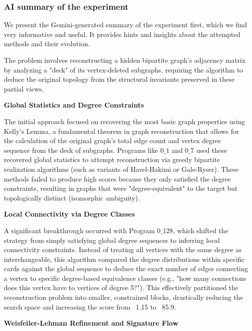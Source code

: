 \documentclass[11pt]{amsart}
\begin{document}
\subsubsection{AI summary of the experiment} We present the Gemini-generated summary of the experiment first, which we find very informative and useful. It provides hints and insights about the attempted methods and their evolution.
\begin{tcolorbox}[
  enhanced,
  breakable,
  title={Gemini-generated summary},
  colback=gray!3,
  colframe=black!30,
  title after break={Gemini-generated summary (continued)}
]
The problem involves reconstructing a hidden bipartite graph's adjacency matrix by analyzing a "deck" of its vertex-deleted subgraphs, requiring the algorithm to deduce the original topology from the structural invariants preserved in these partial views.

\noindent \textbf{Global Statistics and Degree Constraints}

The initial approach focused on recovering the most basic graph properties using Kelly’s Lemma, a fundamental theorem in graph reconstruction that allows for the calculation of the original graph's total edge count and vertex degree sequence from the deck of subgraphs. Programs like $0\_1$ and $0\_7$ used these recovered global statistics to attempt reconstruction via greedy bipartite realization algorithms (such as variants of Havel-Hakimi or Gale-Ryser). These methods failed to produce high scores because they only satisfied the degree constraints, resulting in graphs that were "degree-equivalent" to the target but topologically distinct (isomorphic ambiguity).

\noindent \textbf{Local Connectivity via Degree Classes}

A significant breakthrough occurred with Program $0\_128$, which shifted the strategy from simply satisfying global degree sequences to inferring local connectivity constraints. Instead of treating all vertices with the same degree as interchangeable, this algorithm compared the degree distributions within specific cards against the global sequence to deduce the exact number of edges connecting a vertex to specific degree-based equivalence classes (e.g., "how many connections does this vertex have to vertices of degree 5?"). This effectively partitioned the reconstruction problem into smaller, constrained blocks, drastically reducing the search space and increasing the score from ~1.15 to ~85.9.

\noindent \textbf{Weisfeiler-Lehman Refinement and Signature Flow}


\end{tcolorbox}
\end{document}
